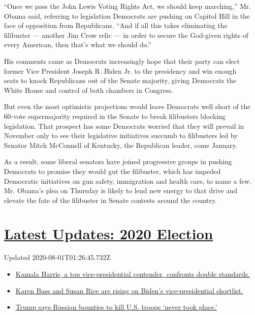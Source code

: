 ``Once we pass the John Lewis Voting Rights Act, we should keep
marching,'' Mr. Obama said, referring to legislation Democrats are
pushing on Capitol Hill in the face of opposition from Republicans.
``And if all this takes eliminating the filibuster --- another Jim Crow
relic --- in order to secure the God-given rights of every American,
then that's what we should do.''

His comments came as Democrats increasingly hope that their party can
elect former Vice President Joseph R. Biden Jr. to the presidency and
win enough seats to knock Republicans out of the Senate majority, giving
Democrats the White House and control of both chambers in Congress.

But even the most optimistic projections would leave Democrats well
short of the 60-vote supermajority required in the Senate to break
filibusters blocking legislation. That prospect has some Democrats
worried that they will prevail in November only to see their legislative
initiatives succumb to filibusters led by Senator Mitch McConnell of
Kentucky, the Republican leader, come January.

As a result, some liberal senators have joined progressive groups in
pushing Democrats to promise they would gut the filibuster, which has
impeded Democratic initiatives on gun safety, immigration and health
care, to name a few. Mr. Obama's plea on Thursday is likely to lend new
energy to that drive and elevate the fate of the filibuster in Senate
contests around the country.

\hypertarget{latest-updates-2020-election}{%
\section{\texorpdfstring{\href{https://www.nytimes.com/2020/07/31/us/elections/biden-vs-trump.html?action=click\&pgtype=Article\&state=default\&region=MAIN_CONTENT_1\&context=storylines_live_updates}{Latest
Updates: 2020
Election}}{Latest Updates: 2020 Election}}\label{latest-updates-2020-election}}

Updated 2020-08-01T01:26:45.732Z

\begin{itemize}
\tightlist
\item
  \href{https://www.nytimes.com/2020/07/31/us/elections/biden-vs-trump.html?action=click\&pgtype=Article\&state=default\&region=MAIN_CONTENT_1\&context=storylines_live_updates\#link-29fdff45}{Kamala
  Harris, a top vice-presidential contender, confronts double
  standards.}
\item
  \href{https://www.nytimes.com/2020/07/31/us/elections/biden-vs-trump.html?action=click\&pgtype=Article\&state=default\&region=MAIN_CONTENT_1\&context=storylines_live_updates\#link-13ec3d9c}{Karen
  Bass and Susan Rice are rising on Biden's vice-presidential
  shortlist.}
\item
  \href{https://www.nytimes.com/2020/07/31/us/elections/biden-vs-trump.html?action=click\&pgtype=Article\&state=default\&region=MAIN_CONTENT_1\&context=storylines_live_updates\#link-49e9a016}{Trump
  says Russian bounties to kill U.S. troops `never took place.'}
\end{itemize}

